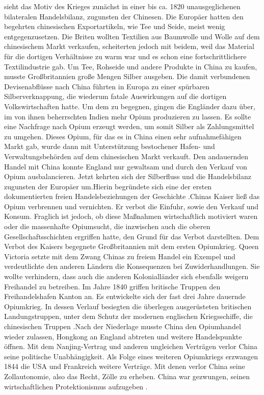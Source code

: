  \citet{Straubhaar.2011} sieht das Motiv des Krieges zun{\"a}chst in einer bis ca. 1820 unausgeglichenen bilateralen Handelsbilanz, zugunsten der Chinesen. Die Europ{\"a}er hatten den begehrten chinesischen Exportartikeln, wie Tee und Seide, meist wenig entgegenzusetzen. Die Briten wollten Textilien aus Baumwolle und Wolle auf dem chinesischem Markt verkaufen, scheiterten jedoch mit beidem, weil das Material f{\"u}r die dortigen Verh{\"a}ltnisse zu warm war und es schon eine fortschrittlichere Textilindustrie gab. Um Tee, Rohseide und andere Produkte in China zu kaufen, musste Gro{\ss}britannien gro{\ss}e Mengen Silber ausgeben. Die damit verbundenen Devisenabfl{\"u}sse nach China f{\"u}hrten in Europa zu einer sp{\"u}rbaren Silberverknappung, die wiederum fatale Auswirkungen auf die dortigen Volkswirtschaften hatte. Um dem zu begegnen, gingen die Engl{\"a}nder dazu {\"u}ber, im von ihnen beherrschten Indien mehr Opium produzieren zu lassen. Es sollte eine Nachfrage nach Opium erzeugt werden, um somit Silber als Zahlungsmittel zu umgehen.  Dieses Opium, f{\"u}r das es in China einen sehr aufnahmef{\"a}higen Markt gab, wurde dann mit Unterst{\"u}tzung bestochener Hafen- und Verwaltungsbeh{\"o}rden auf dem chinesischen Markt verkauft. Den andauernden Handel mit China konnte England nur gewaltsam und durch den Verkauf von Opium ausbalancieren. Jetzt kehrten sich der {\dq}Silberfluss{\dq} und die Handelsbilanz zugunsten der Europ{\"a}er um.\newline Hierin begr{\"u}ndete sich eine der ersten dokumentierten {\dq}freien{\dq} Handelsbeziehungen der Geschichte \citep{Straubhaar.2011}.\newline Chinas Kaiser lie{\ss} das Opium verbrennen und vernichten. Er verbot die Einfuhr, sowie den Verkauf und Konsum. Fraglich ist jedoch, ob diese Ma{\ss}nahmen wirtschaftlich motiviert waren oder die massenhafte Opiumsucht, die inzwischen auch die oberen Gesellschaftsschichten ergriffen hatte, den Grund f{\"u}r das Verbot darstellten. \newline Dem Verbot des Kaisers begegnete Gro{\ss}britannien mit dem ersten Opiumkrieg. Queen Victoria setzte mit dem Zwang Chinas zu freiem Handel ein Exempel und verdeutlichte den anderen L{\"a}ndern die Konsequenzen bei Zuwiderhandlungen. Sie wollte verhindern, dass auch die anderen Koloniall{\"a}nder sich ebenfalls weigern Freihandel zu betreiben.  Im Jahre 1840 griffen britische Truppen den Freihandelshafen Kanton an. Es entwickelte sich der fast drei Jahre dauernde Opiumkrieg. In dessen Verlauf besiegten die {\"u}berlegen ausger{\"u}steten britischen Landungstruppen, unter dem Schutz der modernen englischen Kriegsschiffe, die chinesischen Truppen \citep{Straubhaar.2011}.\newline Nach der Niederlage musste China den Opiumhandel wieder zulassen, Hongkong an England abtreten und weitere Handelspunkte {\"o}ffnen. Mit dem Nanjing-Vertrag und anderen ungleichen Vertr{\"a}gen verlor China seine politische Unabh{\"a}ngigkeit. Als Folge eines weiteren Opiumkriegs erzwangen 1844 die USA und Frankreich weitere Vertr{\"a}ge. Mit denen verlor China seine Zollautonomie, also das Recht, Z{\"o}lle zu erheben. China war gezwungen, seinen wirtschaftlichen Protektionismus aufzugeben \citep{Straubhaar.2011}.
